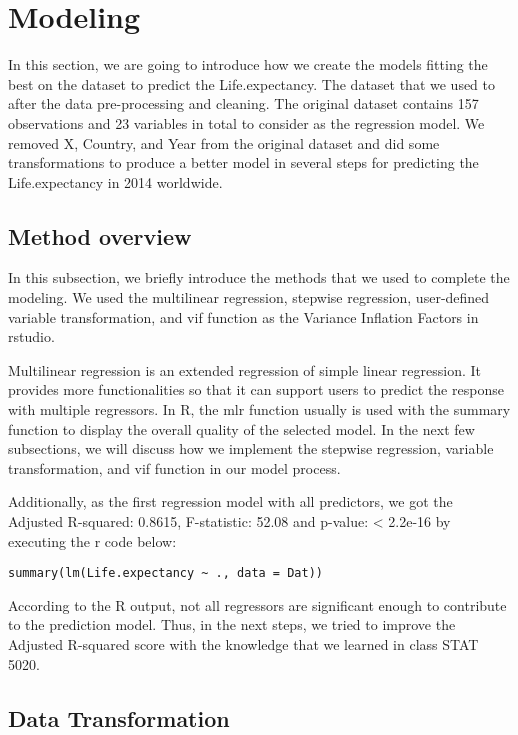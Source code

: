 \section{Modeling}
\label{sec:modeling}

In this section, we are going to introduce how we create the models fitting the best on the dataset to predict the Life.expectancy. The dataset that we used to after the data pre-processing and cleaning. The original dataset contains 157 observations and 23 variables in total to consider as the regression model. We removed X, Country, and Year from the original dataset and did some transformations to produce a better model in several steps for predicting the Life.expectancy in 2014 worldwide.

\subsection{Method overview}

In this subsection, we briefly introduce the methods that we used to complete the modeling. We used the multilinear regression, stepwise regression, user-defined variable transformation, and vif function as the Variance Inflation Factors in rstudio.

Multilinear regression is an extended regression of simple linear regression. It provides more functionalities so that it can support users to predict the response with multiple regressors. In R, the mlr function usually is used with the summary function to display the overall quality of the selected model. In the next few subsections, we will discuss how we implement the stepwise regression, variable transformation, and vif function in our model process.

Additionally, as the first regression model with all predictors, we got the Adjusted R-squared: 0.8615, F-statistic: 52.08 and p-value: < 2.2e-16 by executing the r code below:

\begin{verbatim}
summary(lm(Life.expectancy ~ ., data = Dat))
\end{verbatim}

According to the R output, not all regressors are significant enough to contribute to the prediction model. Thus, in the next steps, we tried to improve the Adjusted R-squared score with the knowledge that we learned in class STAT 5020.

\subsection{Data Transformation}

